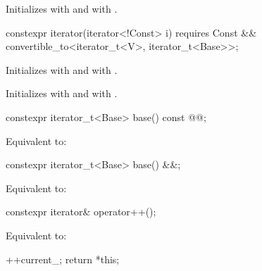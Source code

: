 \documentclass{wg21}
\begin{document}
\begin{itemdescr}
\pnum
\effects Initializes  with   and
 with .
\end{itemdescr}

%
\begin{itemdecl}
constexpr iterator(iterator<!Const> i)
requires Const && convertible_to<iterator_t<V>, iterator_t<Base>>;
\end{itemdecl}

\begin{itemdescr}
\pnum
\effects Initializes  with  and
 with .
\end{itemdescr}

\begin{itemdescr}
	\pnum
	\effects Initializes  with  and
	 with .
\end{itemdescr}

\begin{itemdecl}
constexpr iterator_t<Base> base() const @@;
\end{itemdecl}

\begin{itemdescr}
	\pnum
	\effects Equivalent to: 
\end{itemdescr}


\begin{addedblock}
\begin{itemdecl}
constexpr iterator_t<Base> base() &&;
\end{itemdecl}

\begin{itemdescr}
\pnum
\effects Equivalent to: 
\end{itemdescr}
\end{addedblock}




\begin{itemdecl}
constexpr iterator& operator++();
\end{itemdecl}

\begin{itemdescr}
\pnum
\effects Equivalent to:
\begin{codeblock}
	++current_;
	return *this;
\end{codeblock}
\end{itemdescr}
\end{document}
